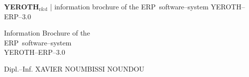 \documentclass[a4paper, 10pt]{article}
\newcommand{\erpsoftwaresystem}{ERP~software--system\xspace}
\newcommand{\yerothrd}{\textcolor{yerothColorGreen}
			{\textsc{\textcolor{yerothColorRed}{YEROTH}}$_{\text{r\&d}}$\xspace}}
\newcommand{\yerotherpblack}{YEROTH--ERP--$3.0$\xspace}
\newcommand{\myfullacademicname}{Dipl.--Inf. XAVIER NOUMBISSI NOUNDOU\xspace}
\begin{document}
\thispagestyle{OnlyFirstPage}

{\bf \LARGE \yerothrd} {| \sc \scriptsize information brochure of the \erpsoftwaresystem \yerotherpblack}

\vspace{2.0em}

\begin{center}
{\LARGE Information Brochure of the \\
    \vspace{0.3em}
    \erpsoftwaresystem \\
    \vspace{0.5em}
    \yerotherpblack}
\end{center}

\vspace{2.0em}

\begin{center}
{\large \myfullacademicname}
\end{center}

\vspace{1.0em}
\end{document}
